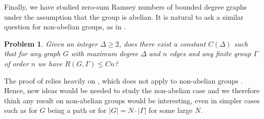 \documentclass{article}
\newtheorem{problem}{Problem}
\theoremstyle{definition}
\begin{document}
Finally, we have studied zero-sum Ramsey numbers of bounded degree graphs under the assumption that the group is abelian. It is natural to ask a similar question for non-abelian groups, as in \cite{Caro92allgroups}.
  \begin{problem}\label{prob:nonabelian}
   Given an integer $\Delta\geq 2$, does there exist a constant $C(\Delta)$ such that for any graph $G$ with maximum degree $\Delta$ and $n$ edges and any finite group $\Gamma$ of order $n$ we have $R(G, \Gamma)\leq Cn$?
 \end{problem}

 The proof of  relies heavily on , which does not apply to non-abelian groups \cite{OlsonKneser}. Hence, new ideas would be needed to study the non-abelian case and we therefore think any result on non-abelian groups would be interesting, even in simpler cases such as for $G$ being a path or for $|G|=N\cdot |\Gamma|$ for some large $N$. 



 
\end{document}
